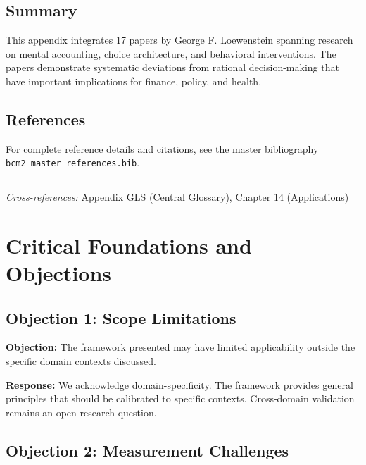 \subsection{Summary}

This appendix integrates 17 papers by George F. Loewenstein
spanning research on mental accounting, choice architecture, and behavioral
interventions. The papers demonstrate systematic deviations from rational
decision-making that have important implications for finance, policy, and health.

\subsection{References}

For complete reference details and citations, see the master bibliography
\texttt{bcm2\_master\_references.bib}.

\vspace{1em}
\hrule
\vspace{0.5em}

\noindent\textit{Cross-references:}
Appendix GLS (Central Glossary), Chapter 14 (Applications)



\section{Critical Foundations and Objections}
\label{sec:loe-foundations}

\subsection{Objection 1: Scope Limitations}

\textbf{Objection:} The framework presented may have limited applicability
outside the specific domain contexts discussed.

\textbf{Response:} We acknowledge domain-specificity. The framework provides
general principles that should be calibrated to specific contexts. Cross-domain
validation remains an open research question.

\subsection{Objection 2: Measurement Challenges}

